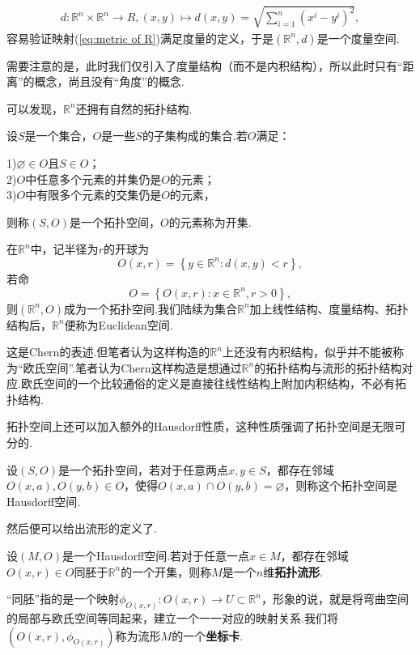 	\begin{equation}\label{eq:metric of R}
		\begin{split}
			d:\mathbb{R}^n\times \mathbb{R}^n\rightarrow R,(x,y)\mapsto d(x,y)=\sqrt{\sum_{i=1}^n(x^i-y^i)^2},
		\end{split}
	\end{equation}
	容易验证映射(\ref{eq:metric of R})满足度量的定义，于是$(\mathbb{R}^n,d)$是一个度量空间.
	\begin{remark}
		需要注意的是，此时我们仅引入了度量结构（而不是内积结构），所以此时只有“距离”的概念，尚且没有“角度”的概念.
	\end{remark}
	可以发现，$\mathbb{R}^n$还拥有自然的拓扑结构.
	\begin{definition}
		设$S$是一个集合，$O$是一些$S$的子集构成的集合.若$O$满足：

		1)$\varnothing\in O$且$S\in O$；\\
		2)$O$中任意多个元素的并集仍是$O$的元素；\\
		3)$O$中有限多个元素的交集仍是$O$的元素，

		则称$(S,O)$是一个拓扑空间，$O$的元素称为开集.
	\end{definition}
	在$\mathbb{R}^n$中，记半径为$r$的开球为$$O(x,r)=\left\{y\in\mathbb{R}^n:d(x,y)<r\right\},$$若命
	$$O=\left\{O(x,r):x\in\mathbb{R}^n,r>0\right\},$$
	则$(\mathbb{R}^n,O)$成为一个拓扑空间.我们陆续为集合$\mathbb{R}^n$加上线性结构、度量结构、拓扑结构后，$\mathbb{R}^n$便称为Euclidean空间.
	\begin{remark}
		这是Chern的表述.但笔者认为这样构造的$\mathbb{R}^n$上还没有内积结构，似乎并不能被称为“欧氏空间”.笔者认为Chern这样构造是想通过$\mathbb{R}^n$的拓扑结构与流形的拓扑结构对应.欧氏空间的一个比较通俗的定义是直接往线性结构上附加内积结构，不必有拓扑结构.
	\end{remark}
	拓扑空间上还可以加入额外的Hausdorff性质，这种性质强调了拓扑空间是无限可分的.
	\begin{definition}
		设$(S,O)$是一个拓扑空间，若对于任意两点$x,y\in S$，都存在邻域$O(x,a),O(y,b)\in O$，使得$O(x,a)\cap O(y,b)=\varnothing$，则称这个拓扑空间是Hausdorff空间.
	\end{definition}
	然后便可以给出流形的定义了.
	\begin{definition}
		设$(M,O)$是一个Hausdorff空间.若对于任意一点$x\in M$，都存在邻域$O(x,r)\in O$同胚于$\mathbb{R}^n$的一个开集，则称$M$是一个$n$维\textbf{拓扑流形}.
	\end{definition}
	\begin{remark}
		“同胚”指的是一个映射$\phi_{O(x,r)}:O(x,r)\rightarrow U\subset \mathbb{R}^n$，形象的说，就是将弯曲空间的局部与欧氏空间等同起来，建立一个一一对应的映射关系.我们将$(O(x,r),\phi_{O(x,r)})$称为流形$M$的一个\textbf{坐标卡}.
	\end{remark}
	
